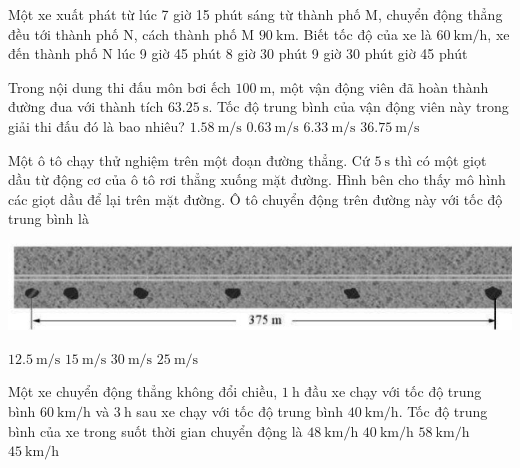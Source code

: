 \begin{ex}
	Một xe xuất phát từ lúc 7 giờ 15 phút sáng từ thành phố M, chuyển động thẳng đều tới thành phố N, cách thành phố M $\SI{90}{\kilo\meter}$. Biết tốc độ của xe là $\SI{60}{\kilo\meter/\hour}$, xe đến thành phố N lúc
	\choice
	{9 giờ 45 phút}
	{8 giờ 30 phút}
	{9 giờ 30 phút}
	{ giờ 45 phút}
\end{ex}
\begin{ex}
	Trong nội dung thi đấu môn bơi ếch $\SI{100}{\meter}$, một vận động viên đã hoàn thành đường đua với thành tích $\SI{63.25}{\second}$. Tốc độ trung bình của vận động viên này trong giải thi đấu đó là bao nhiêu?
	\choice
	{\True $\SI{1.58}{\meter/\second}$}
	{$\SI{0.63}{\meter/\second}$}
	{$\SI{6.33}{\meter/\second}$}
	{$\SI{36.75}{\meter/\second}$}
\end{ex}
\begin{ex}
	Một ô tô chạy thử nghiệm trên một đoạn đường thẳng. Cứ $\SI{5}{\second}$ thì có một giọt dầu từ động cơ của ô tô rơi thẳng xuống mặt đường. Hình bên cho thấy mô hình các giọt dầu để lại trên mặt đường. Ô tô chuyển động trên đường này với tốc độ trung bình là
	\begin{center}
		\includegraphics[width=0.5\linewidth]{figs/VN10-2022-PH-TP004-1-P-1}
	\end{center}	
	\choice
	{$\SI{12.5}{\meter/\second}$}
	{\True $\SI{15}{\meter/\second}$}
	{$\SI{30}{\meter/\second}$}
	{$\SI{25}{\meter/\second}$}
\end{ex}
\begin{ex}
	Một xe chuyển động thẳng không đổi chiều, $\SI{1}{\hour}$ đầu xe chạy với tốc độ trung bình $\SI{60}{\kilo\meter/\hour}$ và $\SI{3}{\hour}$ sau xe chạy với tốc độ trung bình $\SI{40}{\kilo\meter/\hour}$. Tốc độ trung bình của xe trong suốt thời gian chuyển động là
	\choice
	{$\SI{48}{\kilo\meter/\hour}$}
	{$\SI{40}{\kilo\meter/\hour}$}
	{$\SI{58}{\kilo\meter/\hour}$}
	{\True $\SI{45}{\kilo\meter/\hour}$}
\end{ex}
